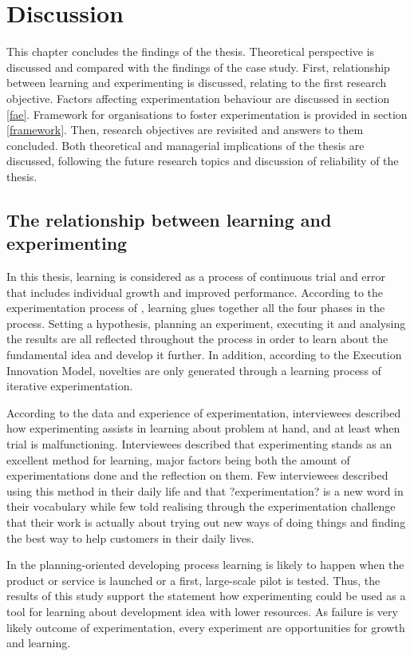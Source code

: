 \chapter{Discussion}
This chapter concludes the findings of the thesis. Theoretical perspective is discussed and compared with the findings of the case study. First, relationship between learning and experimenting is discussed, relating to the first research objective. Factors affecting experimentation behaviour are discussed in section \ref{fae}. Framework for organisations to foster experimentation is provided in section \ref{framework}. Then, research objectives are revisited and answers to them concluded. Both theoretical and managerial implications of the thesis are discussed, following the future research topics and discussion of reliability of the thesis. 

\section{The relationship between learning and experimenting} \label{relation}
In this thesis, learning is considered as a process of continuous trial and error \citep{argyris1978organizational,edmondson1999psychological} that includes individual growth and improved performance. According to the experimentation process of \citet{thomke1998managing}, learning glues together all the four phases in the process. Setting a hypothesis, planning an experiment, executing it and analysing the results are all reflected throughout the process in order to learn about the fundamental idea and develop it further. In addition, according to the Execution Innovation Model, novelties are only generated through a learning process of iterative experimentation. \citep{tuulenmaki2011art} 

According to the data and experience of experimentation, interviewees described how experimenting assists in learning about problem at hand, and at least when trial is malfunctioning. Interviewees described that experimenting stands as an excellent method for learning, major factors being both the amount of experimentations done and the reflection on them. Few interviewees described using this method in their daily life and that ?experimentation? is a new word in their vocabulary while few told realising through the experimentation challenge that their work is actually about trying out new ways of doing things and finding the best way to help customers in their daily lives.

In the planning-oriented developing process learning is likely to happen when the product or service is launched or a first, large-scale pilot is tested. Thus, the results of this study support the statement how experimenting could be used as a tool for learning about development idea with lower resources. As failure is very likely outcome of experimentation, every experiment are opportunities for growth and learning. 

